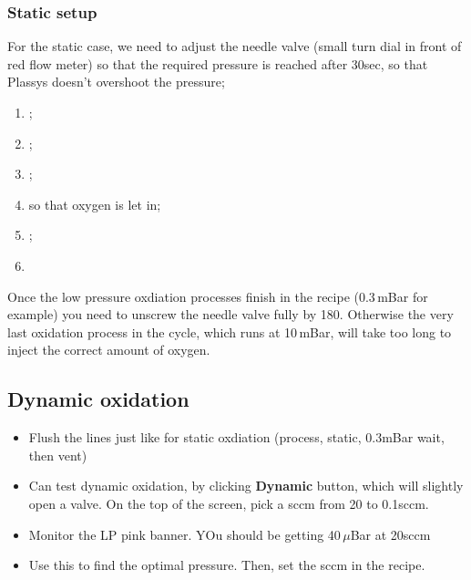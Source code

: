   \subsubsection{Static setup}
  For the static case, we need to adjust the needle valve (small turn
  dial in front  of red flow meter) so that  the required pressure is
  reached  after  30sec,  so   that  Plassys  doesn't  overshoot  the
  pressure;
  \begin{enumerate}
  \item {};
  \item {};
  \item {};
  \item {} so that oxygen is let in;
  \item  {};
  \item  {}
  \end{enumerate}
  {\LARGE Once  the low  pressure oxdiation  processes finish  in the
    recipe (0.3\,mBar  for example)  you need  to unscrew  the needle
    valve  fully  by 180\ideg.   Otherwise  the  very last  oxidation
    process in the cycle, which runs  at 10\,mBar, will take too long
    to inject the correct amount of oxygen.  }

  \subsection{Dynamic oxidation}

\begin{itemize}
\item Flush the lines just like for static oxdiation (process, static, 0.3mBar wait, then vent)
\item Can test dynamic oxidation, by clicking \textbf{Dynamic} button, which will slightly open a valve. On the top of the screen, pick a sccm from 20 to 0.1sccm.
\item Monitor the LP pink banner. YOu should be getting 40\,$\mu$Bar at 20sccm
  \item Use this to find the optimal pressure. Then, set the sccm in the recipe.
  \end{itemize}


